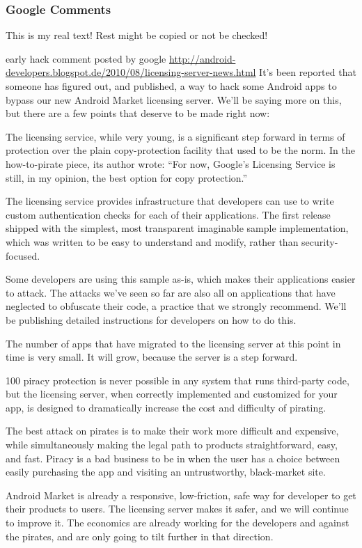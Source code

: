 \subsubsection{Google Comments}\label{subsection:license-google-google}
This is my real text! Rest might be copied or not be checked!



early hack comment posted by google \url{http://android-developers.blogspot.de/2010/08/licensing-server-news.html}
\newline
It’s been reported that someone has figured out, and published, a way to hack some Android apps to bypass our new Android Market licensing server. We’ll be saying more on this, but there are a few points that deserve to be made right now:

The licensing service, while very young, is a significant step forward in terms of protection over the plain copy-protection facility that used to be the norm. In the how-to-pirate piece, its author wrote: “For now, Google’s Licensing Service is still, in my opinion, the best option for copy protection.”

The licensing service provides infrastructure that developers can use to write custom authentication checks for each of their applications. The first release shipped with the simplest, most transparent imaginable sample implementation, which was written to be easy to understand and modify, rather than security-focused.

Some developers are using this sample as-is, which makes their applications easier to attack. The attacks we’ve seen so far are also all on applications that have neglected to obfuscate their code, a practice that we strongly recommend. We’ll be publishing detailed instructions for developers on how to do this.

The number of apps that have migrated to the licensing server at this point in time is very small. It will grow, because the server is a step forward.

100 piracy protection is never possible in any system that runs third-party code, but the licensing server, when correctly implemented and customized for your app, is designed to dramatically increase the cost and difficulty of pirating.

The best attack on pirates is to make their work more difficult and expensive, while simultaneously making the legal path to products straightforward, easy, and fast. Piracy is a bad business to be in when the user has a choice between easily purchasing the app and visiting an untrustworthy, black-market site.

Android Market is already a responsive, low-friction, safe way for developer to get their products to users. The licensing server makes it safer, and we will continue to improve it. The economics are already working for the developers and against the pirates, and are only going to tilt further in that direction.
\newline
